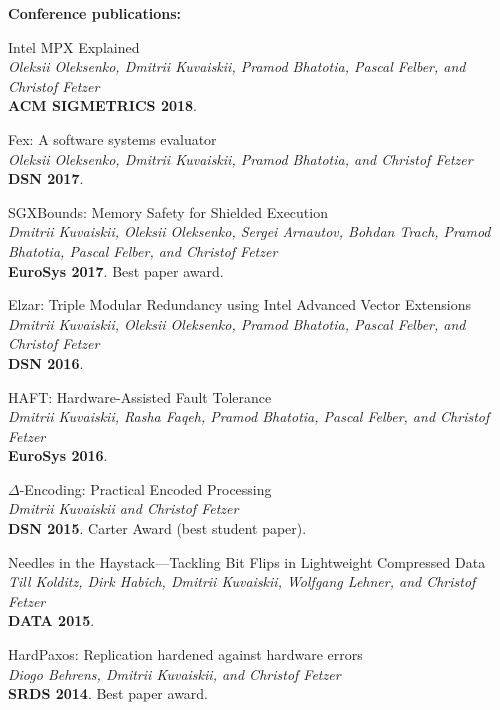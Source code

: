\documentclass[letterpaper]{article}
\renewenvironment{itemize}{
  \begin{list}{}{
    \setlength{\leftmargin}{1.5em}
  }
}{
  \end{list}
}
\begin{document}
{\bf Conference publications:}
\begin{itemize}

\item Intel MPX Explained\\
{\em Oleksii Oleksenko, {Dmitrii Kuvaiskii}, Pramod Bhatotia,  Pascal Felber, and Christof Fetzer}\\
{\bf ACM SIGMETRICS 2018}.

\item Fex: A software systems evaluator\\
{\em Oleksii Oleksenko, {Dmitrii Kuvaiskii}, Pramod Bhatotia, and Christof Fetzer}\\
{\bf  DSN 2017}.

\item SGXBounds: Memory Safety for Shielded Execution\\
{\em Dmitrii Kuvaiskii, Oleksii Oleksenko, Sergei Arnautov, Bohdan Trach, Pramod Bhatotia, Pascal Felber, and Christof Fetzer}\\
{\bf  EuroSys 2017}. Best paper award.

\item Elzar: Triple Modular Redundancy using Intel Advanced Vector Extensions\\
{\em Dmitrii Kuvaiskii, Oleksii Oleksenko, Pramod Bhatotia, Pascal Felber, and  Christof Fetzer}\\
{\bf  DSN 2016}.

\item HAFT: Hardware-Assisted Fault Tolerance\\
{\em Dmitrii Kuvaiskii, Rasha Faqeh, Pramod Bhatotia, Pascal Felber, and  Christof Fetzer}\\
{\bf  EuroSys 2016}.

\item $\Delta$-Encoding: Practical Encoded Processing\\
{\em Dmitrii Kuvaiskii and Christof Fetzer}\\
{\bf   DSN 2015}. Carter Award (best student paper).

\item Needles in the Haystack---Tackling Bit Flips in Lightweight Compressed Data\\
{\em Till Kolditz, Dirk Habich, {Dmitrii Kuvaiskii}, Wolfgang Lehner, and Christof Fetzer}\\
{\bf DATA 2015}.

\item HardPaxos: Replication hardened against hardware errors\\
{\em Diogo Behrens, {Dmitrii Kuvaiskii}, and Christof Fetzer}\\
{\bf SRDS 2014}. Best paper award.

\end{itemize}
\end{document}
